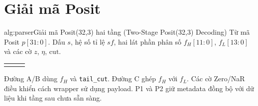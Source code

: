 \section{Giải mã Posit}
\begin{reportpseudocode}{alg:parser}{Giải mã Posit(32,3) hai tầng (Two-Stage Posit(32,3) Decoding)}
  {Từ mã Posit $p[31:0]$.}
  {Dấu $s$, hệ số tỉ lệ $sf$, hai lát phần phân số $f_H[11:0]$, $f_L[13:0]$ và các cờ $z$, $\eta$, $\mathrm{cut}$.}
  \begin{tabularx}{\linewidth}{@{}r >{\raggedright\arraybackslash}X >{\raggedright\arraybackslash}p{.33\linewidth}@{}}
    \algline{1}{\textbf{P1} \quad $s\gets p[31]$, $u\gets (p[30:0]=0)$}{Tách bit dấu và kiểm tra tải dữ liệu.}
    \algline{2}{$z\gets \neg s\land u$, $\eta\gets s\land u$}{Phát hiện các trường hợp Zero và NaR.}
    \algline{3}{$m\gets p$ \textbf{if} $s=0$ \textbf{else} $(-p\bmod 2^{32})$}{Lấy trị tuyệt đối không dấu 32 bit.}
    \algline{4}{$r\gets m[30]$, $v\gets m[28:0]$}{Đọc bit regime và hạt dịch trái 29 bit.}
    \algline{5}{$d\gets (m[29:0]\oplus m[30:1])\mathbin{\|}1$}{Đánh dấu biên chuyển đổi regime và thêm bit chốt.}
    \algline{6}{$c\gets \mathrm{LZC}(d)$}{Đếm số bit 0 dẫn đầu; chốt tầng P1.}
    \algline{7}{\textbf{P2} \quad $w[28:0]\gets v\ll c$, $e\gets w[28:26]$}{Dịch chuẩn hóa và trích 3 bit mũ.}
    \algline{8}{$k[5:0]\gets \mathop{\mathrm{NOT}}\bigl(\{0,c\}\oplus\{6\{r\}\}\bigr)$}{Tính $k$ không rẽ nhánh ($c$ nếu $r=1$, $-c-1$ nếu $r=0$).}
    \algline{9}{\textbf{if} $z\lor\eta$ \textbf{then} $sf\gets 0$ \textbf{else} $sf\gets (k\ll 3)+e$}{Ghép hệ số tỉ lệ có dấu khi toán hạng hữu hạn.}
    \algline{10}{$f_H\gets w[25:14]$, $f_L\gets w[13:0]$}{Chia phần phân số thành lát cao và lát thấp.}
    \algline{11}{$\mathrm{cut}\gets(f_L\ne 0)$}{Bật cờ cắt đuôi nếu lát thấp khác 0.}
    \algline{12}{\textbf{return} $s,sf,f_H,f_L,z,\eta,\mathrm{cut}$}{Chốt ngõ ra tại tầng đường ống P2.}
  \end{tabularx}
\end{reportpseudocode}
Đường A/B dùng $f_H$ và \texttt{tail\_cut}. Đường C ghép $f_H$ với $f_L$.
Các cờ Zero/NaR điều khiển cách wrapper sử dụng payload.
P1 và P2 giữ metadata đồng bộ với dữ liệu khi tầng sau chưa sẵn sàng.



